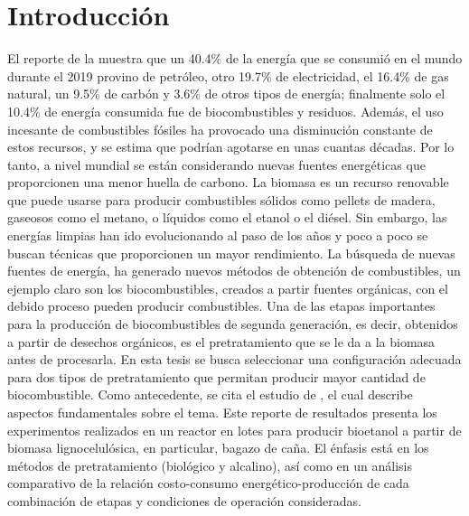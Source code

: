 \documentclass[12pt]{article}
\begin{document}
	
	\pagestyle{empty}
	
	
	\tableofcontents
	\date{}
     \newpage
	\listoftables
	\clearpage
	\newpage
	
	
	\pagestyle{plain}
	\setcounter{page}{1} 
	
		\section{Introducción}
	El reporte de la \cite{EIA2019} muestra que un 40.4\% de la energía que se consumió en el mundo durante el 2019 provino de petróleo, otro 19.7\% de electricidad, el 16.4\% de gas natural, un 9.5\% de carbón y 3.6\% de otros tipos de energía; finalmente solo el 10.4\%  de energía consumida fue de biocombustibles y residuos. Además, el uso incesante de combustibles fósiles ha provocado una disminución constante de estos recursos, y se estima que podrían agotarse en unas cuantas décadas. Por lo tanto, a nivel mundial se están considerando nuevas fuentes energéticas que proporcionen una menor huella de carbono. La biomasa es un recurso renovable que puede usarse para producir combustibles sólidos como pellets de madera, gaseosos como el metano, o líquidos como el etanol o el diésel. 
	Sin embargo, las energías limpias han ido evolucionando al paso de los años y poco a poco se buscan técnicas que proporcionen un mayor rendimiento.
	La búsqueda de nuevas fuentes de energía, ha generado nuevos métodos de obtención de combustibles, un ejemplo claro son los biocombustibles, creados a partir fuentes orgánicas, con el debido proceso pueden producir combustibles.
	Una de las etapas importantes para la producción de biocombustibles de segunda generación, es decir, obtenidos a partir de desechos orgánicos, es el pretratamiento que se le da a la biomasa antes de procesarla. En esta tesis se busca seleccionar una configuración adecuada para dos tipos de pretratamiento que permitan producir mayor cantidad de biocombustible. Como antecedente, se cita el estudio de \cite{zuliani2021biorefinery}, el cual describe aspectos fundamentales sobre el tema. Este reporte de resultados presenta los experimentos realizados en un reactor en lotes para producir bioetanol a partir de biomasa lignocelulósica, en particular, bagazo de caña. El énfasis está en los métodos de pretratamiento (biológico y alcalino), así como en un análisis comparativo de la relación costo-consumo energético-producción de cada combinación de etapas y condiciones de operación consideradas.
	
\end{document}
